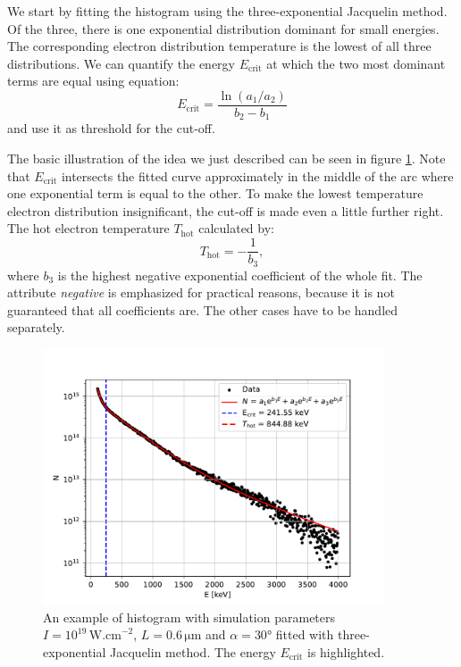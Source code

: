 We start by fitting the histogram using the three-exponential Jacquelin method. Of the three, there is one exponential distribution dominant for small energies. The corresponding electron distribution temperature is the lowest of all three distributions. We can quantify the energy $E_{\mathrm{crit}}$ at which the two most dominant terms are equal using equation:
\begin{equation}
	E_{\mathrm{crit}} = \frac{\ln{\left(a_1/a_2\right)}}{b_2-b_1}
\end{equation}
and use it as threshold for the cut-off. 

The basic illustration of the idea we just described can be seen in figure \ref{fig:3exp-fit-cut-example}. Note that $E_{\mathrm{crit}}$ intersects the fitted curve approximately in the middle of the arc where one exponential term is equal to the other. To make the lowest temperature electron distribution insignificant, the cut-off is made even a little further right. The hot electron temperature $T_\mathrm{hot}$ calculated by:
\begin{equation}
	T_{\mathrm{hot}} = -\frac{1}{b_3},
\end{equation}
where $b_3$ is the highest negative exponential coefficient of the whole fit. The attribute \textit{negative} is emphasized for practical reasons, because it is not guaranteed that all coefficients are. The other cases have to be handled separately. 
	
\begin{figure}[t]
	\centering
	\includegraphics[width=0.9\textwidth]{figures/hist_1e19_060_30_3exp}
	\caption{An example of histogram with simulation parameters $I=10^{19}\,\mathrm{W.cm}^{-2}$, $L=0.6\,\mathrm{\mu m}$ and $\alpha = 30$° fitted with three-exponential Jacquelin method. The energy $E_{\mathrm{crit}}$ is highlighted.}
	\label{fig:3exp-fit-cut-example}
\end{figure}

